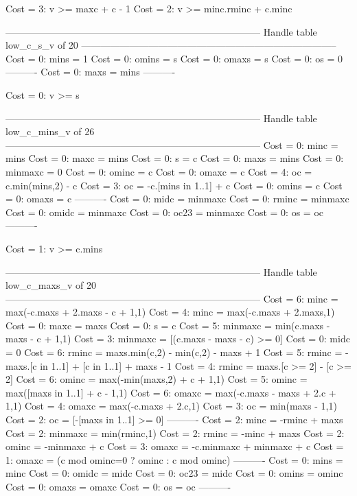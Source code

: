 Cost =  3:  v >= maxc + c - 1
Cost =  2:  v >= minc.rminc + c.minc

--------------------------------------------------------------------------------
Handle table low_c_s_v of 20
--------------------------------------------------------------------------------
Cost =  0:  mins  = 1
Cost =  0:  omins = s
Cost =  0:  omaxs = s
Cost =  0:  os    = 0
----------
Cost =  0:  maxs  = mins
----------

Cost =  0:  v >= s

--------------------------------------------------------------------------------
Handle table low_c_mins_v of 26
--------------------------------------------------------------------------------
Cost =  0:  minc    = mins
Cost =  0:  maxc    = mins
Cost =  0:  s       = c
Cost =  0:  maxs    = mins
Cost =  0:  minmaxc = 0
Cost =  0:  ominc   = c
Cost =  0:  omaxc   = c
Cost =  4:  oc      = c.min(mins,2) - c
Cost =  3:  oc      = -c.[mins in 1..1] + c
Cost =  0:  omins   = c
Cost =  0:  omaxs   = c
----------
Cost =  0:  midc    = minmaxc
Cost =  0:  rminc   = minmaxc
Cost =  0:  omidc   = minmaxc
Cost =  0:  oc23    = minmaxc
Cost =  0:  os      = oc
----------

Cost =  1:  v >= c.mins

--------------------------------------------------------------------------------
Handle table low_c_maxs_v of 20
--------------------------------------------------------------------------------
Cost =  6:  minc    = max(-c.maxs + 2.maxs - c + 1,1)
Cost =  4:  minc    = max(-c.maxs + 2.maxs,1)
Cost =  0:  maxc    = maxs
Cost =  0:  s       = c
Cost =  5:  minmaxc = min(c.maxs - maxs - c + 1,1)
Cost =  3:  minmaxc = [(c.maxs - maxs - c) >= 0]
Cost =  0:  midc    = 0
Cost =  6:  rminc   = maxs.min(c,2) - min(c,2) - maxs + 1
Cost =  5:  rminc   = -maxs.[c in 1..1] + [c in 1..1] + maxs - 1
Cost =  4:  rminc   = maxs.[c >= 2] - [c >= 2]
Cost =  6:  ominc   = max(-min(maxs,2) + c + 1,1)
Cost =  5:  ominc   = max([maxs in 1..1] + c - 1,1)
Cost =  6:  omaxc   = max(-c.maxs - maxs + 2.c + 1,1)
Cost =  4:  omaxc   = max(-c.maxs + 2.c,1)
Cost =  3:  oc      = min(maxs - 1,1)
Cost =  2:  oc      = [-[maxs in 1..1] >= 0]
----------
Cost =  2:  minc    = -rminc + maxs
Cost =  2:  minmaxc = min(rminc,1)
Cost =  2:  rminc   = -minc + maxs
Cost =  2:  ominc   = -minmaxc + c
Cost =  3:  omaxc   = -c.minmaxc + minmaxc + c
Cost =  1:  omaxc   = (c mod ominc=0 ? ominc : c mod ominc)
----------
Cost =  0:  mins    = minc
Cost =  0:  omidc   = midc
Cost =  0:  oc23    = midc
Cost =  0:  omins   = ominc
Cost =  0:  omaxs   = omaxc
Cost =  0:  os      = oc
----------

